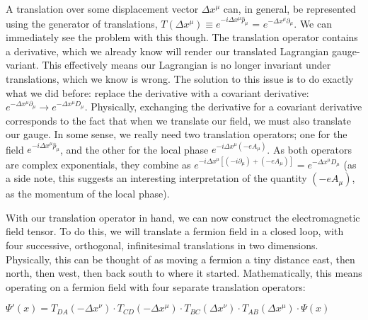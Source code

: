 \documentclass{article}
\begin{document}
        A translation over some displacement vector $\Delta x^\mu$ can, in general, be represented using the generator of translations,
        $T(\Delta x^\mu) \equiv e^{-i \Delta x^\mu \hat p_\mu}$ = $e^{- \Delta x^\mu \partial_\mu}$. We can immediately see the problem with this though. The translation operator contains a derivative, which we already know will render our translated Lagrangian gauge-variant. This effectively means our Lagrangian is no longer invariant under translations, which we know is wrong. The solution to this issue is to do exactly what we did before: replace the derivative with a covariant derivative:
        $e^{- \Delta x^\mu \partial_\mu} \rightarrow e^{- \Delta x^\mu D_\mu}$.
        Physically, exchanging the derivative for a covariant derivative corresponds to the fact that when we translate our field, we must also translate our gauge. In some sense, we really need two translation operators; one for the field
        $e^{-i \Delta x^\mu \hat p_\mu}$, and the other for the local phase
        $e^{-i \Delta x^\mu (-e A_\mu)}$. As both operators are complex exponentials, they combine as 
        $e^{-i \Delta x^\mu [( -i \partial_\mu) + (-e A_\mu)]} = e^{ - \Delta x^\mu D_\mu }$ (as a side note, this suggests an interesting interpretation of the quantity $( -e A_\mu )$, as the momentum of the local phase).

        With our translation operator in hand, we can now construct the electromagnetic field tensor. To do this, we will translate a fermion field in a closed loop, with four successive, orthogonal, infinitesimal translations in two dimensions. Physically, this can be thought of as moving a fermion a tiny distance east, then north, then west, then back south to where it started. Mathematically, this means operating on a fermion field with four separate translation operators:

        $ \Psi'(x) = T_{DA}(-\Delta x^\nu) \cdot 
                     T_{CD}(-\Delta x^\mu) \cdot
                     T_{BC}( \Delta x^\nu) \cdot 
                     T_{AB}( \Delta x^\mu) \cdot \Psi(x) $

        \vspace{5pt}
        \begin{center}  \end{center}
        \vspace{5pt}
        
\end{document}
